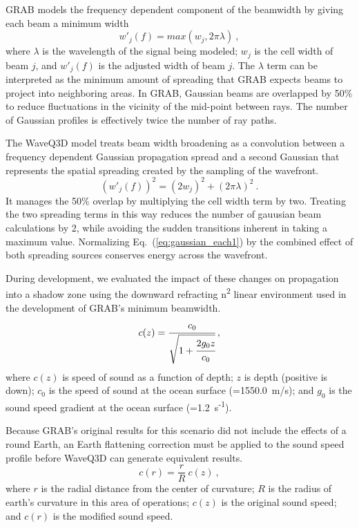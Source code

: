 \documentclass{ws-jca}
\begin{document}
GRAB\cite{Weinberg1996} models the frequency dependent component of the
beamwidth by giving each beam a minimum width
\begin{equation}
  w'_j(f) = max \left( w_j, 2 \pi \lambda \right) \:, 
  \label{eq:weinberg_width}
\end{equation}
where 
\(\lambda\) is the wavelength of the signal being modeled;
\(w_j\) is the cell width of beam $j$, and
\(w'_j(f)\) is the adjusted width of beam $j$.
The \(\lambda\) term can be interpreted as the minimum amount of spreading that GRAB expects beams to project into neighboring areas.  In GRAB, Gaussian beams are overlapped by 50\% to reduce fluctuations in the vicinity of the mid-point between rays.\cite{Weinberg1996b}  The number of Gaussian profiles is effectively twice the number of ray paths. 

The WaveQ3D model treats beam width broadening as a convolution between a
frequency dependent Gaussian propagation spread and a second Gaussian that
represents the spatial spreading created by the sampling of the wavefront.
\begin{equation}
	(w'_j(f))^2 = \left( 2 w_j \right)^2 + \left( 2 \pi \lambda \right)^2 \:.
	\label{eq:new_width}
\end{equation}
It manages the 50\% overlap by multiplying the cell width term by two.  Treating the two spreading terms in this way reduces the number of gauusian beam calculations by 2, while avoiding the sudden transitions inherent in taking a maximum value. Normalizing
Eq.~(\ref{eq:gaussian_each1}) by the combined effect of both spreading sources conserves energy across the wavefront.

During development, we evaluated the impact of these changes on propagation into a shadow zone using the downward refracting n\textsuperscript{2} linear environment used in the development of GRAB's minimum beamwidth.
\begin{equation}
	c(z) = \cfrac{c_0}{\sqrt{1+\cfrac{2 g_0 z}{c_0}}} \:,
	\label{eq:n2_linear}
\end{equation}
where
\(c(z)\) is speed of sound as a function of depth;
\(z\) is depth (positive is down);
\(c_0\) is the speed of sound at the ocean surface (=1550.0~m/s); and
\(g_0\) is the sound speed gradient at the ocean surface
(=1.2~s\textsuperscript{-1}).

Because GRAB's original results for this scenario did not include the effects of a round Earth, an Earth flattening correction must be applied to the sound speed profile\cite{Pekeris1946} before WaveQ3D can generate equivalent results.
\begin{equation}
	c(r) = \frac{r}{R} \: c(z) \:, 
	\label{eq:n2_correction}
\end{equation}
where
$r$ is the radial distance from the center of curvature;
$R$ is the radius of earth's curvature in this area of operations;
$c(z)$ is the original sound speed; and
$c(r)$ is the modified sound speed.
\end{document}
